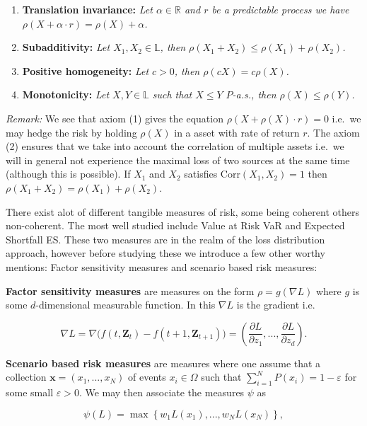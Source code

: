 \documentclass[a4paper,10pt,openany]{book}
\providecommand{\tightlist}{%
 \setlength{\itemsep}{0pt}\setlength{\parskip}{0pt}}
\begin{document}
\begin{enumerate}
\def\labelenumi{\arabic{enumi}.}
\tightlist
\item
  \textbf{Translation invariance:} \emph{Let \(\alpha\in\mathbb{R}\) and \(r\) be a predictable process we have \(\rho(X+\alpha\cdot r)=\rho(X)+\alpha\).}
\item
  \textbf{Subadditivity:} \emph{Let \(X_1,X_2\in\mathbb{L}\), then \(\rho(X_1+X_2)\le \rho(X_1)+\rho(X_2)\).}
\item
  \textbf{Positive homogeneity:} \emph{Let \(c>0\), then \(\rho(cX)=c\rho(X)\).}
\item
  \textbf{Monotonicity:} \emph{Let \(X,Y\in\mathbb{L}\) such that \(X\le Y\) \(P\)-a.s., then \(\rho(X)\le \rho(Y)\).}
\end{enumerate}

\emph{Remark:} We see that axiom (1) gives the equation \(\rho(X+\rho(X)\cdot r)=0\) i.e.~we may hedge the risk by holding \(\rho(X)\) in a asset with rate of return \(r\). The axiom (2) ensures that we take into account the correlation of multiple assets i.e.~we will in general not experience the maximal loss of two sources at the same time (although this is possible). If \(X_1\) and \(X_2\) satisfies \(\text{Corr}(X_1,X_2)=1\) then \(\rho(X_1+X_2)= \rho(X_1)+\rho(X_2)\).

There exist alot of different tangible measures of risk, some being coherent others non-coherent. The most well studied include Value at Risk VaR and Expected Shortfall ES. These two measures are in the realm of the loss distribution approach, however before studying these we introduce a few other worthy mentions: Factor sensitivity measures and scenario based risk measures:

\textbf{Factor sensitivity measures} are measures on the form \(\rho=g(\nabla L)\) where \(g\) is some \(d\)-dimensional measurable function. In this \(\nabla L\) is the gradient i.e.

\[
\nabla L=\nabla \Big(f(t,\mathbf{Z}_t)-f(t+1,\mathbf{Z}_{t+1})\Big)=\left(\frac{\partial L}{\partial z_1},...,\frac{\partial L}{\partial z_d}\right).
\]

\textbf{Scenario based risk measures} are measures where one assume that a collection \(\mathbf{x}=(x_1,...,x_N)\) of events \(x_i\in \Omega\) such that \(\sum_{i=1}^N P(x_i)=1-\varepsilon\) for some small \(\varepsilon>0\). We may then associate the measures \(\psi\) as

\[
\psi(L)=\max\left\{w_1L(x_1),...,w_NL(x_N)\right\},
\]
\end{document}
